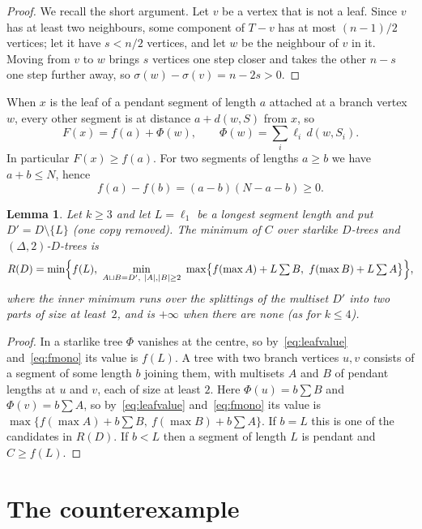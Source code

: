 \documentclass[11pt]{amsart}
\newtheorem{lemma}[thm]{Lemma}
\theoremstyle{definition}
\newcommand{\sig}{\sigma}
\begin{document}
\begin{proof}
We recall the short argument. Let $v$ be a vertex that is not a leaf. Since $v$ has at least two neighbours, some component of $T-v$ has at most
$(n-1)/2$ vertices; let it have $s<n/2$ vertices, and let $w$ be the neighbour of $v$ in it. Moving from $v$ to $w$
brings $s$ vertices one step closer and takes the other $n-s$ one step further away, so
$\sig(w)-\sig(v)=n-2s>0$.
\end{proof}

When $x$ is the leaf of a pendant segment of length $a$ attached at a branch vertex $w$, every other segment is at
distance $a+d(w,S)$ from $x$, so
\begin{equation}\label{eq:leafvalue}
F(x)=f(a)+\Phi(w),\qquad \Phi(w)=\sum_i\ell_i\,d(w,S_i).
\end{equation}
In particular $F(x)\ge f(a)$. For two segments of lengths $a\ge b$ we have $a+b\le N$, hence
\begin{equation}\label{eq:fmono}
f(a)-f(b)=(a-b)(N-a-b)\ge0 .
\end{equation}

\begin{lemma}\label{lem:R}
Let $k\ge3$ and let $L=\ell_1$ be a longest segment length and put $D'=D\setminus\{L\}$ (one copy removed). The minimum of $C$ over
starlike $D$-trees and $(\Delta,2)$-$D$-trees is
\[
R(D)=\min\Bigl\{f(L),\ \min_{A\sqcup B=D',\ |A|,|B|\ge2}\ \max\bigl\{f(\max A)+L\textstyle\sum B,\ f(\max B)+L\sum A\bigr\}\Bigr\},
\]
where the inner minimum runs over the splittings of the multiset $D'$ into two parts of size at least~$2$, and is
$+\infty$ when there are none (as for $k\le4$).
\end{lemma}

\begin{proof}
In a starlike tree $\Phi$ vanishes at the centre, so by~\eqref{eq:leafvalue} and~\eqref{eq:fmono} its value is
$f(L)$. A tree with two branch vertices $u,v$ consists of a segment of some length $b$ joining them, with multisets
$A$ and $B$ of pendant lengths at $u$ and $v$, each of size at least $2$. Here $\Phi(u)=b\sum B$ and
$\Phi(v)=b\sum A$, so by~\eqref{eq:leafvalue} and~\eqref{eq:fmono} its value is
$\max\{f(\max A)+b\sum B,\ f(\max B)+b\sum A\}$. If $b=L$ this is one of the candidates in $R(D)$. If $b<L$ then a
segment of length $L$ is pendant and $C\ge f(L)$.
\end{proof}

\section{The counterexample}\label{sec:cx}
\end{document}
